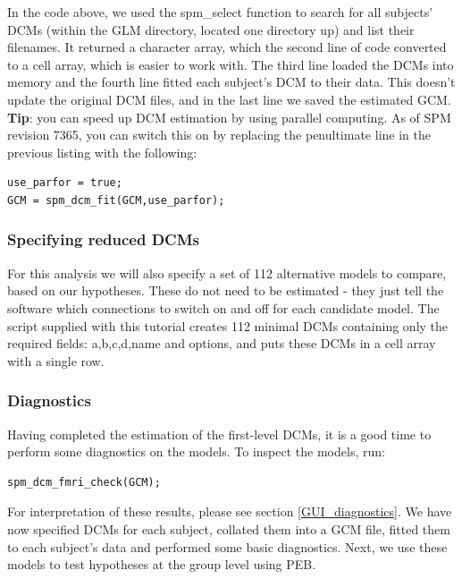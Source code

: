 \documentclass{article}
\begin{document}
In the code above, we used the spm\_select function to search for all subjects' DCMs (within the GLM directory, located one directory up) and list their filenames. It returned a character array, which the second line of code converted to a cell array, which is easier to work with. The third line loaded the DCMs into memory and the fourth line fitted each subject's DCM to their data. This doesn't update the original DCM files, and in the last line we saved the estimated GCM. \\

\textbf{Tip}: you can speed up DCM estimation by using parallel computing. As of SPM revision 7365, you can switch this on by replacing the penultimate line in the previous listing with the following:

\begin{lstlisting}[style=Matlab-editor, caption=Enabling parallel DCM estimation]
use_parfor = true;
GCM = spm_dcm_fit(GCM,use_parfor);

\end{lstlisting}

\subsubsection{Specifying reduced DCMs}
For this analysis we will also specify a set of 112 alternative models to compare, based on our hypotheses. These do not need to be estimated - they just tell the software which connections to switch on and off for each candidate model. The script supplied with this tutorial creates 112 minimal DCMs containing only the required fields: a,b,c,d,name and options, and puts these DCMs in a cell array with a single row.

\subsubsection{Diagnostics}
Having completed the estimation of the first-level DCMs, it is a good time to perform some diagnostics on the models. To inspect the models, run:

\begin{lstlisting}[style=Matlab-editor, caption=DCM for fMRI diagnostics]
spm_dcm_fmri_check(GCM);
\end{lstlisting}

For interpretation of these results, please see section \ref{GUI_diagnostics}. We have now specified DCMs for each subject, collated them into a GCM file, fitted them to each subject's data and performed some basic diagnostics. Next, we use these models to test hypotheses at the group level using PEB.
\end{document}
